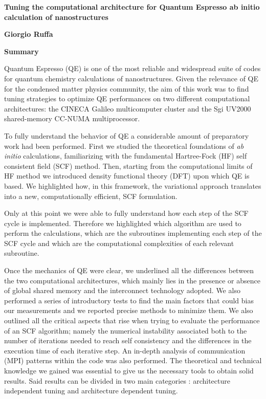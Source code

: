 \documentclass[a4paper,10pt]{article}
\begin{document}
\thispagestyle{plain}
\begin{center}
	\vspace*{-4cm}
    \Large
    \textbf{ Tuning the computational architecture for Quantum Espresso ab initio calculation of nanostructures }
    
    \vspace{0.4cm}
    \textbf{Giorgio Ruffa}
    
    \vspace{0.2cm}
    \textbf{Summary}
\end{center}

Quantum Espresso (QE) is one of the most reliable and widespread  suite of codes for quantum chemistry calculations of nanostructures\cite{QE}. 
Given the relevance of QE for the condensed matter physics community, the aim of this work was to find tuning strategies to optimize QE performances on two different computational architectures: 
the CINECA Galileo multicomputer cluster and the Sgi UV2000 shared-memory CC-NUMA multiprocessor.

To fully understand the behavior of QE a considerable amount of preparatory work had been performed.
First we studied the theoretical foundations of \textit{ab initio} calculations, familiarizing with the fundamental Hartree-Fock (HF) self consistent field (SCF) method\cite{Attila}.
Then, starting from the computational limits of HF method we introduced density functional theory (DFT)\cite{Parr} upon which QE is based.
We highlighted how, in this framework, the variational approach translates into a new, computationally efficient, SCF formulation\cite{Martin}.

Only at this point we were able to fully understand how each step of the SCF cycle is implemented\cite{Marx}.
Therefore we highlighted which algorithm are used to perform the calculations, which are the subroutines implementing each step of the SCF cycle and which are the computational complexities of each relevant subroutine.


Once the mechanics of QE were clear, we underlined all the differences between the two computational architectures, which mainly lies in the presence or absence of global shared memory and the interconnect technology adopted\cite{Tanenbaum}.
We also performed a series of introductory tests to find the main factors that could bias our measurements and we reported precise methods to minimize them. 
We also outlined all the critical aspects that rise when trying to evaluate the performance of an SCF algorithm; namely the numerical instability associated both to the number of iterations needed to reach self consistency and the differences in the execution time of each iterative step.
An in-depth analysis of communication (MPI) patterns within the code was also performed.
The theoretical and technical knowledge we gained was essential to give us the necessary tools to obtain solid results. Said results can be divided in two main categories : architecture independent tuning and architecture dependent tuning.
\end{document}

